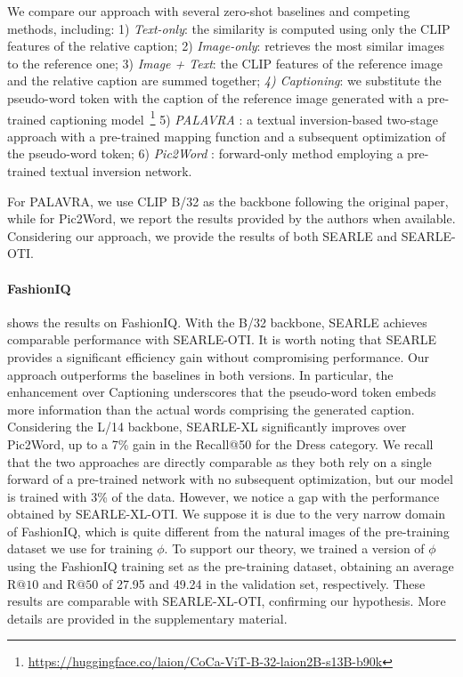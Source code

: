 \documentclass[10pt,twocolumn,letterpaper]{article}
\newcommand{\method}{SEARLE\xspace}
\begin{document}
We compare our approach with several zero-shot baselines and competing methods, including: 1) \textit{Text-only}: the similarity is computed using only the CLIP features of the relative caption; 2) \textit{Image-only}: retrieves the most similar images to the reference one; 3) \textit{Image + Text}: the CLIP features of the reference image and the relative caption are summed together; \textit{4) Captioning}: we substitute the pseudo-word token with the caption of the reference image generated with a pre-trained captioning model~\cite{yu2022coca}\footnote{\href{https://huggingface.co/laion/CoCa-ViT-B-32-laion2B-s13B-b90k}{https://huggingface.co/laion/CoCa-ViT-B-32-laion2B-s13B-b90k}}
5) \textit{PALAVRA} \cite{cohen2022this}: a textual inversion-based two-stage approach with a pre-trained mapping function and a subsequent optimization of the pseudo-word token; 6) \textit{Pic2Word} \cite{saito2023pic2word}: forward-only method employing a pre-trained textual inversion network.

For PALAVRA, we use CLIP B/32 as the backbone following the original paper, while for Pic2Word, we report the results provided by the authors when available.
Considering our approach, we provide the results of both \method and \method-OTI.

\paragraph{FashionIQ}
 shows the results on FashionIQ. With the B/32 backbone, \method achieves comparable performance with \method-OTI. It is worth noting that \method provides a significant efficiency gain without compromising performance. Our approach outperforms the baselines in both versions. In particular, the enhancement over Captioning underscores
that the pseudo-word token embeds more information than the actual words comprising the generated caption. Considering the L/14 backbone, \method-XL significantly improves over Pic2Word, up to a 7\% gain in the Recall@50 for the Dress category. We recall that the two approaches are directly comparable as they both rely on a single forward of a pre-trained network with no subsequent optimization, but our model is trained with 3\% of the data. However, we notice a gap with the performance obtained by \method-XL-OTI. We suppose it is due to the very narrow domain of FashionIQ, which is quite different from the natural images of the pre-training dataset we use for training $\phi$. To support our theory, we trained a version of $\phi$ using the FashionIQ training set as the pre-training dataset, obtaining an average R$@10$ and R$@50$ of 27.95 and 49.24 in the validation set, respectively. These results are comparable with \method-XL-OTI, confirming our hypothesis. More details are provided in the supplementary material.
\end{document}
